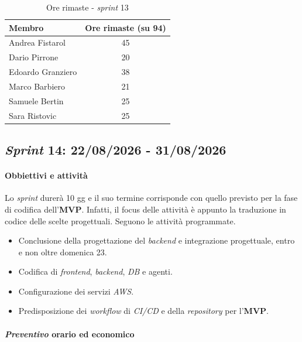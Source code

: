\documentclass[12pt, a4paper]{article}
\begin{document}
{\begin{table}[H]
    \centering
    \renewcommand{\arraystretch}{1.3}
    \begin{tabularx}{0.7\textwidth}{|X|c|}
        \hline
         \textbf{Membro} & \textbf{Ore rimaste (su 94)} \\ \hline
         Andrea Fistarol & 45 \\ \hline
         Dario Pirrone & 20 \\ \hline
         Edoardo Granziero & 38 \\ \hline
         Marco Barbiero & 21 \\ \hline
         Samuele Bertin & 25 \\ \hline
         Sara Ristovic & 25 \\ \hline
    \end{tabularx}
    \caption{Ore rimaste - \textit{sprint} 13}
\end{table}

\subsection{\textit{Sprint} 14: 22/08/2026 - 31/08/2026}
\paragraph{Obbiettivi e attività} Lo \textit{sprint} durerà 10 gg e il suo termine corrisponde con quello previsto per la fase di codifica dell'\textbf{MVP}.
Infatti, il focus delle attività è appunto la traduzione in codice delle scelte progettuali. Seguono le attività programmate.
\begin{itemize}
    \item Conclusione della progettazione del \textit{backend} e integrazione progettuale, entro e non oltre domenica 23.
    \item Codifica di \textit{frontend}, \textit{backend}, \textit{DB} e agenti.
    \item Configurazione dei servizi \textit{AWS}.
    \item Predisposizione dei \textit{workflow} di \textit{CI/CD} e della \textit{repository} per l'\textbf{MVP}.
\end{itemize}

\paragraph{\textit{Preventivo} orario ed economico}

}
\end{document}
